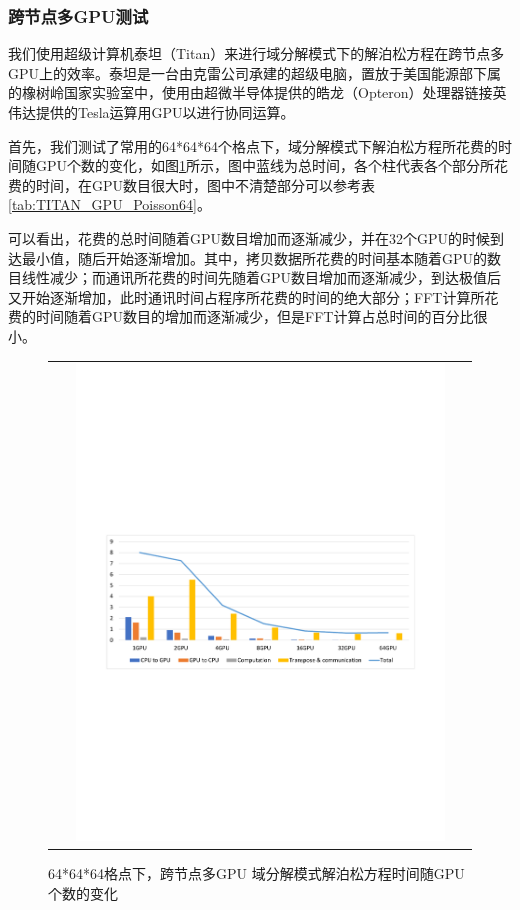 \subsubsection{跨节点多GPU测试}
我们使用超级计算机泰坦（Titan）来进行域分解模式下的解泊松方程在跨节点多GPU上的效率。泰坦是一台由克雷公司承建的超级电脑，置放于美国能源部下属的橡树岭国家实验室中，使用由超微半导体提供的皓龙（Opteron）处理器链接英伟达提供的Tesla运算用GPU以进行协同运算。

首先，我们测试了常用的64*64*64个格点下，域分解模式下解泊松方程所花费的时间随GPU个数的变化，如图\ref{fig:TITAN_GPU_Poisson64}所示，图中蓝线为总时间，各个柱代表各个部分所花费的时间，在GPU数目很大时，图中不清楚部分可以参考表\ref{tab:TITAN_GPU_Poisson64}。

可以看出，花费的总时间随着GPU数目增加而逐渐减少，并在32个GPU的时候到达最小值，随后开始逐渐增加。其中，拷贝数据所花费的时间基本随着GPU的数目线性减少；而通讯所花费的时间先随着GPU数目增加而逐渐减少，到达极值后又开始逐渐增加，此时通讯时间占程序所花费的时间的绝大部分；FFT计算所花费的时间随着GPU数目的增加而逐渐减少，但是FFT计算占总时间的百分比很小。

\begin{figure}[!htb]
  \centering
  \begin{tabular}{|l|l|}
    \multicolumn{2}{c}{
    \includegraphics[width=0.9\textwidth]{Img/domain_decomposition_Titan64.pdf}} \\
  \end{tabular}
  \caption{64*64*64格点下，跨节点多GPU 域分解模式解泊松方程时间随GPU个数的变化}
  \label{fig:TITAN_GPU_Poisson64}
\end{figure}

